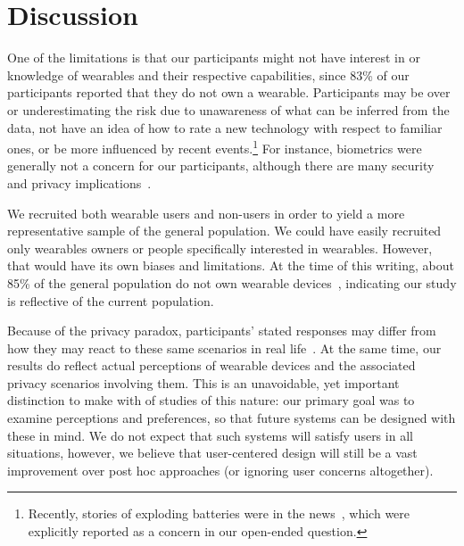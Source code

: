 
\section{Discussion}

One of the limitations is that our participants might not have interest in or knowledge of wearables and their respective capabilities, since 83\% of our participants reported that they do not own a wearable. Participants may be over or underestimating the risk due to unawareness of what can be inferred from the data, not have an idea of how to rate a new technology with respect to familiar ones, or be more influenced by recent events.\footnote{Recently, stories of exploding batteries were in the news~\cite{1_levin_2014}, which were explicitly reported as a concern in our open-ended question.}  For instance, biometrics were generally not a concern for our participants, although there are many security and privacy implications~\cite{prabhakar2003biometric}.

We recruited both wearable users and non-users in order to yield a more representative sample of the general population. We could have easily recruited only wearables owners or people specifically interested in wearables. However, that would have its own biases and limitations. At the time of this writing, about 85\% of the general population do not own wearable devices~\cite{Nilsen,WearableStatNews}, indicating our study is reflective of the current population. 

Because of the privacy paradox, participants' stated responses may differ from how they may react to these same scenarios in real life~\cite{norberg2007privacy, jensen2005privacy}. At the same time, our results do reflect actual perceptions of wearable devices and the associated privacy scenarios involving them. This is an unavoidable, yet important distinction to make with of studies of this nature: our primary goal was to examine perceptions and preferences, so that future systems can be designed with these in mind. We do not expect that such systems will satisfy users in all situations, however, we believe that user-centered design will still be a vast improvement over post hoc approaches (or ignoring user concerns altogether).

